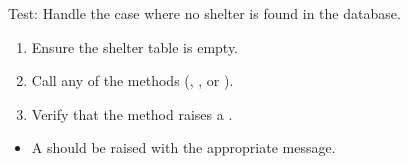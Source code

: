 \documentclass[letterpaper,10pt,english]{sphinxmanual}
\begin{document}
\begin{fulllineitems}
\label{\detokenize{test:test.test_shelter.test_get_shelter_no_shelter_found}}
\pysigstartsignatures
\pysiglinewithargsret
{}
{}
{}
\pysigstopsignatures
\sphinxAtStartPar
Test: Handle the case where no shelter is found in the database.
\begin{description}
\begin{enumerate}
%
\item {} 
\sphinxAtStartPar
Ensure the shelter table is empty.

\item {} 
\sphinxAtStartPar
Call any of the methods (, , or ).

\item {} 
\sphinxAtStartPar
Verify that the method raises a .

\end{enumerate}

\begin{itemize}
\item {} 
\sphinxAtStartPar
A  should be raised with the appropriate message.

\end{itemize}

\end{description}

\end{fulllineitems}

\end{document}
